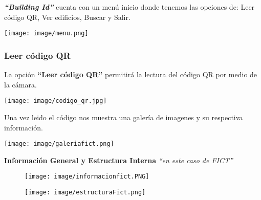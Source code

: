 \documentclass[a4paper,11pt]{article}
\begin{document}
\textbf{\textit{``Building Id''}} cuenta con un men\'{u} inicio donde tenemos las opciones de: 
\newline\newline
\hspace*{3cm}Leer c\'{o}digo QR,
\newline 
\hspace*{3cm}Ver edificios,
\newline 
\hspace*{3cm}Buscar y 
\newline
\hspace*{3cm}Salir.
\begin{center}
	\texttt{[image: image/menu.png]}
\end{center}
	
\subsubsection{Leer c\'{o}digo QR}

La opci\'{o}n \textbf{``Leer c\'{o}digo QR''} permitir\'{a} la lectura del c\'{o}digo QR por medio de la c\'{a}mara.
\begin{center}
		\texttt{[image: image/codigo\_qr.jpg]}
	\end{center}

Una vez leido el c\'{o}digo nos muestra una galer\'{i}a de imagenes y su respectiva informaci\'{o}n.
		\\
		\begin{center}
				\texttt{[image: image/galeriafict.png]}
		\end{center}

\newpage
\hspace*{2cm}\textbf{Informaci\'{o}n General y Estructura Interna} 
		\newline		
		\hspace*{4cm}\textit{``en este caso de FICT''}
		\newline
		
		
		\begin{figure}[h] %
		\hfill
			\begin{minipage}[t]{.45\textwidth}
				\begin{center}
					\texttt{[image: image/informacionfict.PNG]} 
				\end{center}
			\end{minipage}
			\hfill
			\begin{minipage}[t]{.45\textwidth}
				\begin{center}
					\texttt{[image: image/estructuraFict.png]} 
				\end{center}
			\end{minipage}
		\hfill
		\end{figure}
	
\end{document}
